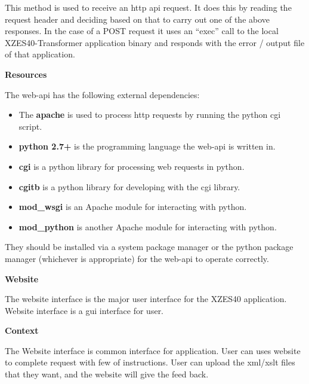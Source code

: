 This method is used to receive an \gls{http} \gls{api} request.
It does this by reading the request header and deciding based on that to carry out one of the above responses.
In the case of a POST request it uses an ``exec'' call to the local XZES40-Transformer application binary and responds with the error / output file of that application.

\textbf{Resources}

The \gls{web-api} has the following external dependencies:

\begin{itemize}
  \item The \textbf{\gls{apache}} is used to process \gls{http} requests by running the \gls{python} \gls{cgi} script.
    \item \textbf{\gls{python} 2.7+} is the programming language the \gls{web-api} is written in.
    \item \textbf{cgi} is a \gls{python} library for processing web requests in \gls{python}.
    \item \textbf{cgitb} is a \gls{python} library for developing with the cgi library.
    \item \textbf{mod\_wsgi} is an Apache module for interacting with \gls{python}.
    \item \textbf{mod\_python} is another Apache module for interacting with \gls{python}.
\end{itemize}

They should be installed via a system package manager or the \gls{python} package manager (whichever is appropriate) for the \gls{web-api} to operate correctly.

\textbf{Website}
\label{website}

The website interface is the major user interface for the XZES40 application.
Website interface is a \gls{gui} interface for user.

\textbf{Context}

The Website interface is common interface for application.
User can uses website to complete request with few of instructions.
User can upload the \gls{xml}/\gls{xslt} files that they want, and the website will give the feed back.

